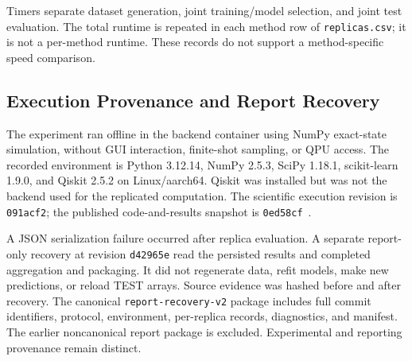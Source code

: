 Timers separate dataset generation, joint training/model selection, and joint test evaluation. The total runtime is repeated in each method row of \texttt{replicas.csv}; it is not a per-method runtime. These records do not support a method-specific speed comparison.

\subsection{Execution Provenance and Report Recovery}
\label{sec:methods-provenance}

The experiment ran offline in the backend container using NumPy exact-state simulation, without GUI interaction, finite-shot sampling, or QPU access. The recorded environment is Python 3.12.14, NumPy 2.5.3, SciPy 1.18.1, scikit-learn 1.9.0, and Qiskit 2.5.2 on Linux/aarch64. Qiskit was installed but was not the backend used for the replicated computation. The scientific execution revision is \texttt{091acf2}; the published code-and-results snapshot is \texttt{0ed58cf}~\cite{aqse2026canonical}.

A JSON serialization failure occurred after replica evaluation. A separate report-only recovery at revision \texttt{d42965e} read the persisted results and completed aggregation and packaging. It did not regenerate data, refit models, make new predictions, or reload TEST arrays. Source evidence was hashed before and after recovery. The canonical \texttt{report-recovery-v2} package includes full commit identifiers, protocol, environment, per-replica records, diagnostics, and manifest. The earlier noncanonical report package is excluded. Experimental and reporting provenance remain distinct.
